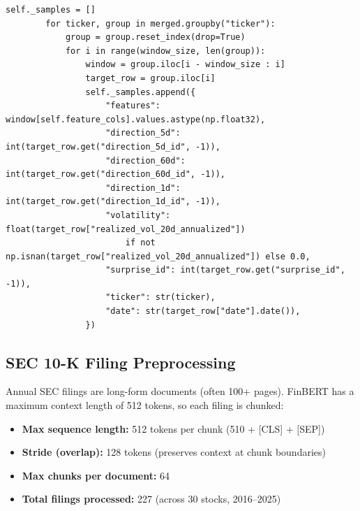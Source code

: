 \documentclass[12pt,a4paper]{article}
\begin{document}
\begin{lstlisting}[caption={PriceWindowDataset (src/data/price\_dataset.py)}]
        self._samples = []
        for ticker, group in merged.groupby("ticker"):
            group = group.reset_index(drop=True)
            for i in range(window_size, len(group)):
                window = group.iloc[i - window_size : i]
                target_row = group.iloc[i]
                self._samples.append({
                    "features": window[self.feature_cols].values.astype(np.float32),
                    "direction_5d": int(target_row.get("direction_5d_id", -1)),
                    "direction_60d": int(target_row.get("direction_60d_id", -1)),
                    "direction_1d": int(target_row.get("direction_1d_id", -1)),
                    "volatility": float(target_row["realized_vol_20d_annualized"])
                        if not np.isnan(target_row["realized_vol_20d_annualized"]) else 0.0,
                    "surprise_id": int(target_row.get("surprise_id", -1)),
                    "ticker": str(ticker),
                    "date": str(target_row["date"].date()),
                })
\end{lstlisting}

\subsection{SEC 10-K Filing Preprocessing}

Annual SEC filings are long-form documents (often 100+ pages). FinBERT has a maximum context length of 512 tokens, so each filing is chunked:

\begin{itemize}[noitemsep]
    \item \textbf{Max sequence length:} 512 tokens per chunk (510 + [CLS] + [SEP])
    \item \textbf{Stride (overlap):} 128 tokens (preserves context at chunk boundaries)
    \item \textbf{Max chunks per document:} 64
    \item \textbf{Total filings processed:} 227 (across 30 stocks, 2016--2025)
\end{itemize}
\end{document}
